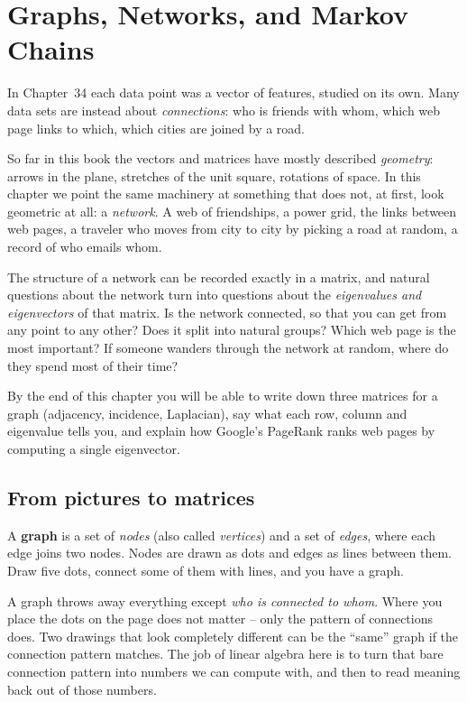 \chapter{Graphs, Networks, and Markov Chains}

In Chapter~34 each data point was a vector of features, studied on its own. Many data
sets are instead about \emph{connections}: who is friends with whom, which web page links
to which, which cities are joined by a road.

So far in this book the vectors and matrices have mostly described \emph{geometry}:
arrows in the plane, stretches of the unit square, rotations of space. In this chapter
we point the same machinery at something that does not, at first, look geometric at
all: a \emph{network}. A web of friendships, a power grid, the links between web pages,
a traveler who moves from city to city by picking a road at random, a record of who
emails whom.

The structure of a network can be recorded exactly in a matrix, and natural questions
about the network turn into questions about the \emph{eigenvalues and eigenvectors} of
that matrix. Is the network connected, so that you can get from any point to any other?
Does it split into natural groups? Which web page is the most important? If someone
wanders through the network at random, where do they spend most of their time?

By the end of this chapter you will be able to write down three matrices for a graph
(adjacency, incidence, Laplacian), say what each row, column and eigenvalue tells you,
and explain how Google's PageRank ranks web pages by computing a single eigenvector.

\section{From pictures to matrices}
\label{ch35:pictures-to-matrices}

A \textbf{graph} is a set of \emph{nodes} (also called \emph{vertices}) and a set of
\emph{edges}, where each edge joins two nodes. Nodes are drawn as dots and edges as lines
between them. Draw five dots, connect some of them with lines, and you have a graph.

\begin{intuitionbox}
A graph throws away everything except \emph{who is connected to whom}. Where you place
the dots on the page does not matter -- only the pattern of connections does. Two drawings
that look completely different can be the ``same'' graph if the connection pattern matches.
The job of linear algebra here is to turn that bare connection pattern into numbers we can
compute with, and then to read meaning back out of those numbers.
\end{intuitionbox}

